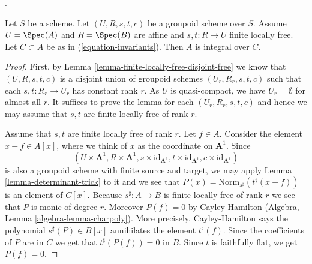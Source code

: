 \begin{lemma}
\label{lemma-integral-over-invariants}
\begin{reference}
\cite[Expos\'e 212, Th\'eor\`eme 5.1 (i), p. 110]{FGA}.
\end{reference}
Let $S$ be a scheme. Let $(U, R, s, t, c)$ be a groupoid scheme over $S$.
Assume $U = \Spec(A)$ and $R = \Spec(B)$ are affine and
$s, t : R \to U$ finite locally free.
Let $C \subset A$ be as in (\ref{equation-invariants}).
Then $A$ is integral over $C$.
\end{lemma}

\begin{proof}
First, by Lemma \ref{lemma-finite-locally-free-disjoint-free}
we know that $(U, R, s, t, c)$ is a disjoint union
of groupoid schemes $(U_r, R_r, s, t, c)$ such that each $s, t : R_r \to U_r$
has constant rank $r$. As $U$ is quasi-compact, we have $U_r = \emptyset$ for
almost all $r$. It suffices to prove the lemma for each $(U_r, R_r, s, t, c)$
and hence we may assume that $s, t$ are finite locally free of rank $r$.

\medskip\noindent
Assume that $s, t$ are finite locally free of rank $r$.
Let $f \in A$. Consider the element $x - f \in A[x]$, where we think
of $x$ as the coordinate on $\mathbf{A}^1$.
Since
$$
(U \times \mathbf{A}^1, R \times \mathbf{A}^1,
s \times \text{id}_{\mathbf{A}^1},
t \times \text{id}_{\mathbf{A}^1},
c \times \text{id}_{\mathbf{A}^1})
$$
is also a groupoid scheme with finite source and target, we may apply
Lemma \ref{lemma-determinant-trick} to it and we see that
$P(x) = \text{Norm}_{s^\sharp}(t^\sharp(x - f))$
is an element of $C[x]$. Because $s^\sharp : A \to B$ is finite locally
free of rank $r$ we see that $P$ is monic of degree $r$.
Moreover $P(f) = 0$ by Cayley-Hamilton
(Algebra, Lemma \ref{algebra-lemma-charpoly}).
More precisely, Cayley-Hamilton says the polynomial
$s^\sharp(P) \in B[x]$ annihilates the element $t^\sharp(f)$.
Since the coefficients of $P$ are in $C$ we get that
$t^\sharp(P(f)) = 0$ in $B$. Since $t$ is faithfully flat,
we get $P(f) = 0$.
\end{proof}

